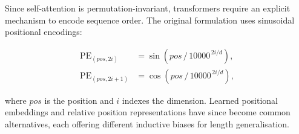 Since self-attention is permutation-invariant, transformers require an explicit mechanism to
encode sequence order. The original formulation uses sinusoidal positional encodings:

\begin{equation}
  \begin{aligned}
    \operatorname{PE}_{(pos,2i)}   &= \sin\!\left( pos \,/\, 10000^{\,2i/d} \right) ,\\
    \operatorname{PE}_{(pos,2i+1)} &= \cos\!\left( pos \,/\, 10000^{\,2i/d} \right) ,
  \end{aligned}
  \label{eq:positional}
\end{equation}

where $pos$ is the position and $i$ indexes the dimension. Learned positional embeddings
\cite{devlin2019bert} and relative position representations \cite{shaw2018self} have since
become common alternatives, each offering different inductive biases for length
generalisation.
